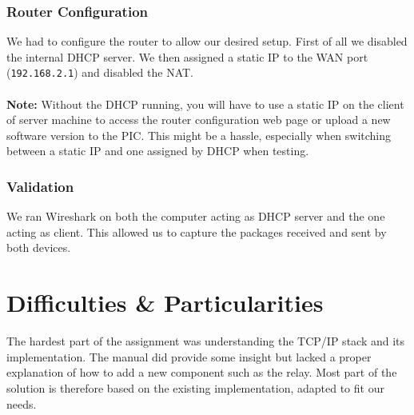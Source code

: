 \documentclass[11pt]{article}
\begin{document}
\subsubsection{Router Configuration}
We had to configure the router to allow our desired setup. First of all we disabled the internal DHCP server. We then assigned a static IP to the WAN port (\texttt{192.168.2.1}) and disabled the NAT. \\
\\
\textbf{Note:} Without the DHCP running, you will have to use a static IP on the client of server machine to access the router configuration web page or upload a new software version to the PIC. This might be a hassle, especially when switching between a static IP and one assigned by DHCP when testing.

\subsubsection{Validation}
We ran Wireshark on both the computer acting as DHCP server and the one acting as client. This allowed us to capture the packages received and sent by both devices.

\section{Difficulties \& Particularities}
The hardest part of the assignment was understanding the TCP/IP stack and its implementation. The manual did provide some insight but lacked a proper explanation of how to add a new component such as the relay. Most part of the solution is therefore based on the existing implementation, adapted to fit our needs.
\end{document}
